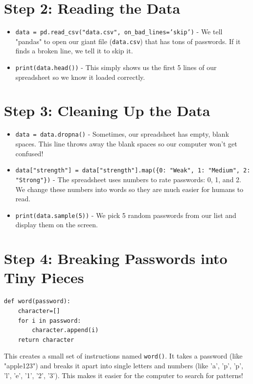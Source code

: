 \documentclass{article}
\begin{document}
\section*{Step 2: Reading the Data}
\begin{itemize}
    \item \texttt{data = pd.read\_csv("data.csv", on\_bad\_lines='skip')} - We tell "pandas" to open our giant file (\texttt{data.csv}) that has tons of passwords. If it finds a broken line, we tell it to skip it.
    \item \texttt{print(data.head())} - This simply shows us the first 5 lines of our spreadsheet so we know it loaded correctly.
\end{itemize}

\section*{Step 3: Cleaning Up the Data}
\begin{itemize}
    \item \texttt{data = data.dropna()} - Sometimes, our spreadsheet has empty, blank spaces. This line throws away the blank spaces so our computer won't get confused!
    \item \texttt{data["strength"] = data["strength"].map(\{0: "Weak", 1: "Medium", 2: "Strong"\})} - The spreadsheet uses numbers to rate passwords: 0, 1, and 2. We change these numbers into words so they are much easier for humans to read.
    \item \texttt{print(data.sample(5))} - We pick 5 random passwords from our list and display them on the screen.
\end{itemize}

\section*{Step 4: Breaking Passwords into Tiny Pieces}
\begin{verbatim}
def word(password):
    character=[]
    for i in password:
        character.append(i)
    return character
\end{verbatim}

This creates a small set of instructions named \texttt{word()}. It takes a password (like "apple123") and breaks it apart into single letters and numbers (like 'a', 'p', 'p', 'l', 'e', '1', '2', '3'). This makes it easier for the computer to search for patterns!
\end{document}
